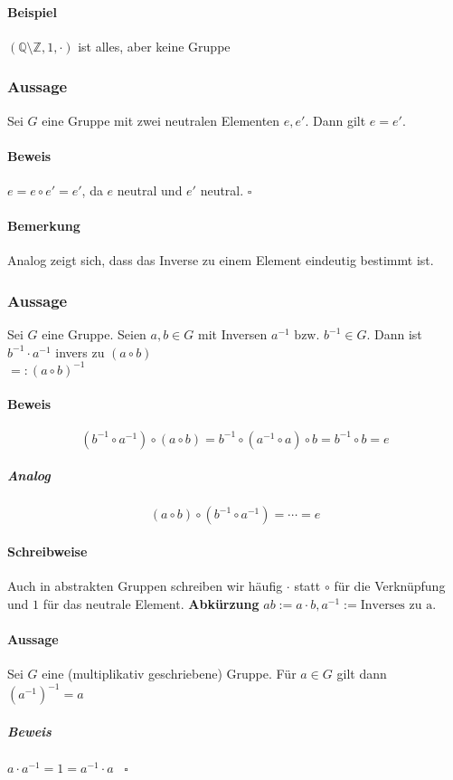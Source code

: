 \documentclass[14pt,a4paper]{article}
\newcommand{\Z}{\ensuremath{\mathbb{Z}}}
\newcommand{\Q}{\ensuremath{\mathbb{Q}}}
\begin{document}
  \paragraph{Beispiel} $(\Q \setminus \Z, 1, \cdot)$ ist alles, aber keine
  Gruppe

  \subsubsection{Aussage}
  Sei $G$ eine Gruppe mit zwei neutralen Elementen $e, e'$. Dann gilt $e = e'$.

  \paragraph{Beweis}
  $e = e \circ e' = e'$, da $e$ neutral und $e'$ neutral. $\square$

  \paragraph{Bemerkung}
  Analog zeigt sich, dass das Inverse zu einem Element eindeutig bestimmt ist.

  \subsubsection{Aussage}
  Sei $G$ eine Gruppe. Seien $a,b \in G$ mit Inversen $a^{-1} \text{ bzw. }
  b^{-1} \in G$.
  Dann ist $b^{-1} \cdot a^{-1}$ invers zu $(a \circ b)$ \\ $=: ( a \circ
  b)^{-1}$

  \paragraph{Beweis}
  $$ (b^{-1} \circ a^{-1}) \circ (a \circ b) = b^{-1} \circ (a^{-1} \circ a)
\circ b = b^{-1} \circ b = e $$
  \subparagraph{Analog}
  $$ (a \circ b) \circ (b^{-1} \circ a^{-1}) = \dotsb = e $$

  \paragraph{Schreibweise}
  Auch in abstrakten Gruppen schreiben wir häufig $\cdot$ statt $\circ$ für die
  Verknüpfung und $1$ für das neutrale Element.
  \textbf{Abkürzung} $ab := a \cdot b, a^{-1} := \text{Inverses zu a}$.

  \paragraph{Aussage}
  Sei $G$ eine (multiplikativ geschriebene) Gruppe. Für $ a \in G$ gilt dann
  $(a^{-1})^{-1} = a$
  \subparagraph{Beweis}
  $a \cdot a^{-1} = 1 = a^{-1} \cdot a\;\;\;\square$
\end{document}
